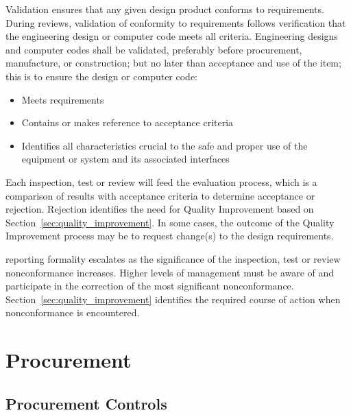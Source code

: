 Validation ensures that any given design product conforms to 
requirements.
During reviews, validation of conformity to requirements
follows verification that the engineering design or computer code
meets all criteria. Engineering designs and computer codes shall be
validated, preferably before procurement, manufacture, or
construction; but no later than acceptance and use of the item; this
is to ensure the design or computer code:
\begin{itemize}
 \item Meets  requirements
 \item Contains or makes reference to acceptance criteria
 \item Identifies all characteristics crucial to the safe and proper
   use of the equipment or system and its associated interfaces
\end{itemize}

Each inspection, test or review will feed the  evaluation
process, which is a comparison of results with acceptance criteria to
determine acceptance or rejection. Rejection identifies the need for
Quality Improvement based on Section~\ref{sec:quality_improvement}. In
some cases, the outcome of the Quality Improvement process may be to
request change(s) to the design requirements.

 reporting formality escalates as the significance of the
inspection, test or review nonconformance increases. Higher levels of
management must be aware of and participate in the correction of the
most significant nonconformance. Section~\ref{sec:quality_improvement}
identifies the required course of action when nonconformance is
encountered.

\section{Procurement}

\subsection{Procurement Controls}

